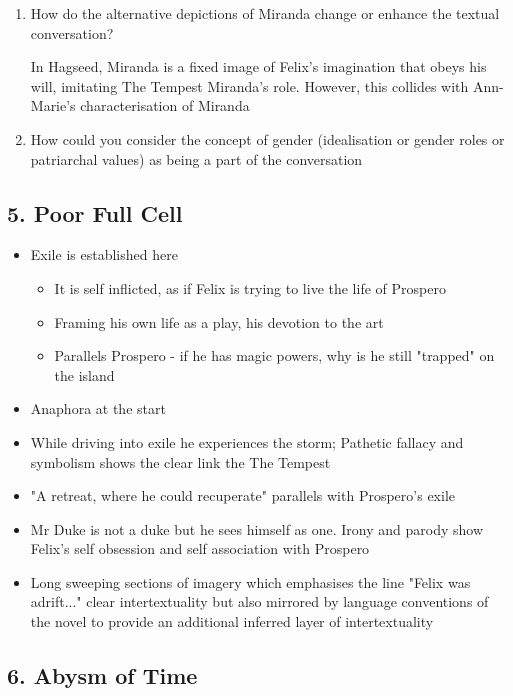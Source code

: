 			\begin{enumerate}
				\item How do the alternative depictions of Miranda change or enhance the textual conversation?

					In Hagseed, Miranda is a fixed image of Felix's imagination that obeys his will, imitating The Tempest Miranda's role. However, this collides with Ann-Marie's characterisation of Miranda

				\item How could you consider the concept of gender (idealisation or gender roles or patriarchal values) as being a part of the conversation
			\end{enumerate}
	
	\subsection{5. Poor Full Cell}
	
		\begin{itemize}
			\item Exile is established here
				\begin{itemize}
					\item It is self inflicted, as if Felix is trying to live the life of Prospero
					\item Framing his own life as a play, his devotion to the art
					\item Parallels Prospero - if he has magic powers, why is he still "trapped" on the island
				\end{itemize}
			\item Anaphora at the start
			\item While driving into exile he experiences the storm; Pathetic fallacy and symbolism shows the clear link the The Tempest
			\item "A retreat, where he could recuperate" parallels with Prospero's exile
			\item Mr Duke is not a duke but he sees himself as one. Irony and parody show Felix's self obsession and self association with Prospero
			\item Long sweeping sections of imagery which emphasises the line "Felix was adrift..." clear intertextuality but also mirrored by language conventions of the novel to provide an additional inferred layer of intertextuality
		\end{itemize}
	
	\subsection{6. Abysm of Time}
	
